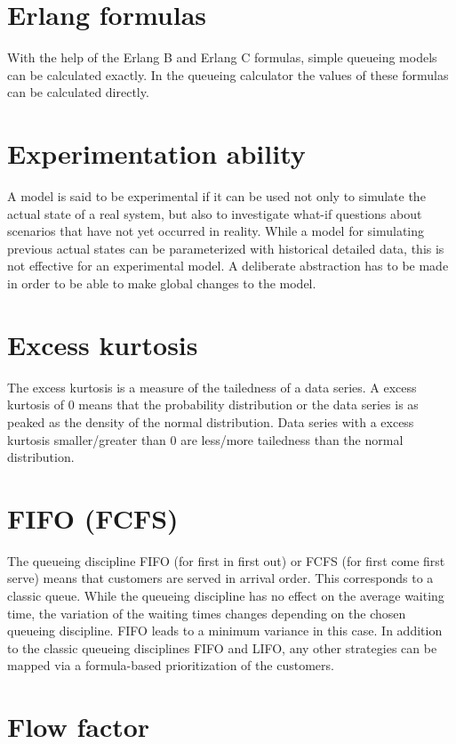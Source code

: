 \section*{Erlang formulas}


With the help of the Erlang B and Erlang C formulas, simple queueing models can be calculated exactly.
In the queueing calculator the values of these formulas can be calculated directly.

\section*{Experimentation ability}


A model is said to be experimental if it can be used not only to simulate the actual state of a real system,
but also to investigate what-if questions about scenarios that have not yet occurred in reality.
While a model for simulating previous actual states can be parameterized with historical detailed data,
this is not effective for an experimental model. A deliberate abstraction has to be made in order
to be able to make global changes to the model.

\section*{Excess kurtosis}


The excess kurtosis is a measure of the tailedness of a data series.
A excess kurtosis of 0 means that the probability distribution or the data series is as peaked as the density of the normal distribution.
Data series with a excess kurtosis smaller/greater than 0 are less/more tailedness than the normal distribution.

\section*{FIFO (FCFS)}


The queueing discipline FIFO (for first in first out) or FCFS (for first come first serve) means
that customers are served in arrival order. This corresponds to a classic queue.
While the queueing discipline has no effect on the average waiting time, the variation
of the waiting times changes depending on the chosen queueing discipline.
FIFO leads to a minimum variance in this case. In addition to the classic queueing disciplines
FIFO and LIFO, any other strategies can be mapped via a formula-based prioritization of the customers.

\section*{Flow factor}


